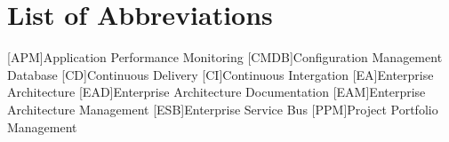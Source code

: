 
\chapter*{List of Abbreviations}

\begin{acronym}[ewuifbwejkbfjksbjkcbsdjcjkn3j]%
[APM]{Application Performance Monitoring}
[CMDB]{Configuration Management Database}
[CD]{Continuous Delivery}
[CI]{Continuous Intergation}
[EA]{Enterprise Architecture}
[EAD]{Enterprise Architecture Documentation}
[EAM]{Enterprise Architecture Management}
[ESB]{Enterprise Service Bus}
[PPM]{Project Portfolio Management}

%


\end{acronym}